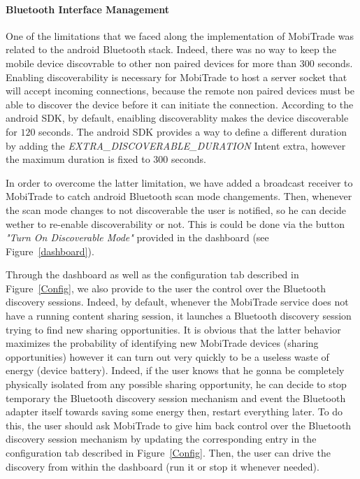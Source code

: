 \paragraph{Bluetooth Interface Management}

One of the limitations that we faced along the implementation of MobiTrade was related to the android Bluetooth stack. Indeed, there
was no way to keep the mobile device discovrable to other non paired devices for more than 300 seconds. Enabling discoverability is necessary for MobiTrade to host a server socket that will accept incoming connections, because the remote non paired devices must be able to discover the device before it can initiate the connection. According to the android SDK, by default, enaibling discoverablity makes the device discoverable for $120$ seconds. The android SDK provides a way to define a different duration by adding the \emph{EXTRA\_DISCOVERABLE\_DURATION} Intent extra, however the maximum duration is fixed to 300 seconds.

In order to overcome the latter limitation, we have added a broadcast receiver to MobiTrade to catch android Bluetooth scan mode changements. Then, whenever the scan mode changes to not discoverable the user is notified, so he can decide wether to re-enable discoverability or not. This is could be done via the button \emph{"Turn On Discoverable Mode"} provided in the dashboard (see Figure~\ref{dashboard}).

Through the dashboard as well as the configuration tab described in Figure~\ref{Config}, we also provide to the user the control over the Bluetooth discovery sessions. Indeed, by default, whenever the MobiTrade service does not have a running content sharing session, it launches a Bluetooth discovery session trying to find new sharing opportunities. It is obvious that the latter behavior maximizes the probability of identifying new MobiTrade devices (sharing opportunities) however it can turn out very quickly to be a useless waste of energy (device battery). Indeed, if the user knows that he gonna be completely physically isolated from any possible sharing opportunity, he can decide to stop temporary the Bluetooth discovery session mechanism and event the Bluetooth adapter itself towards saving some energy then, restart everything later. To do this, the user should ask MobiTrade to give him back control over the Bluetooth discovery session mechanism by updating the corresponding entry in the configuration tab described in Figure~\ref{Config}. Then, the user can drive the discovery from within the dashboard (run it or stop it whenever needed).

